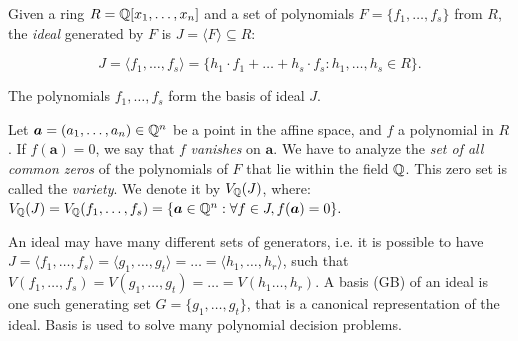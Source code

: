 \begin{Definition}
Given a ring $R={\mathbb{Q}}[x_1,\dots, x_n]$ and a set of polynomials
$F=\{f_1,\dots,f_s\}$ from $R$, the {\it ideal} generated by $F$ is $J =
\langle F \rangle \subseteq R$: 
\vspace{-0.2in}

{\small
\begin{equation}
J = \langle f_1, \dots, f_s \rangle = \{ h_1\cdot f_1 + \dots+h_s\cdot
f_s:  h_1,\dots,h_s\in R\}.
\end{equation}
}
\vspace{-0.2in}

The polynomials $f_1,\dots,f_s$ form the basis of ideal $J$.
\end{Definition}

Let $\bm{a} = (a_1,\dots,a_n) \in {\mathbb{Q}}^n$ be a point in the affine
space, and $f$ a polynomial in $R$. If $f(\bm{a}) = 0$, we say
that $f$ {\it vanishes} on $\bm{a}$. We have to
analyze the {\it set of all common zeros} of the polynomials of $F$
that lie %
within the field ${\mathbb{Q}}$. This zero set is called the {\it variety}.
We denote it by $V_{{\mathbb{Q}}}(J)$, where: 
$V_{{\mathbb{Q}}}(J) = V_{{\mathbb{Q}}}(f_1, \dots, f_s) = \{\bm{a} \in {\mathbb{Q}}^n: \forall
f \in J, f(\bm{a}) = 0\}.$


An ideal may have many different sets of generators, i.e. it is
possible to have $J = \langle f_1, \dots, f_s\rangle = \langle g_1,
\dots, g_t \rangle = \dots = \langle h_1,\dots, h_r\rangle$, such that
$V(f_1,\dots,f_s)= V(g_1,\dots,g_t)=\dots=V(h_1\dots,h_r)$. A \Grobner
basis (GB) of an ideal is one such generating set $G=\{g_1, \dots,
g_t\}$, that is a canonical representation of the ideal. \Grobner Basis is used to solve
many polynomial decision problems. %


